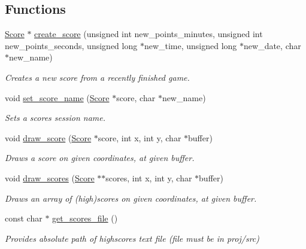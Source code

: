 \subsection*{Functions}
\begin{DoxyCompactItemize}
\item 
\hyperlink{struct_score}{Score} $\ast$ \hyperlink{group__score_gac0781ace02ea3b0c0326eedcbe331017}{create\+\_\+score} (unsigned int new\+\_\+points\+\_\+minutes, unsigned int new\+\_\+points\+\_\+seconds, unsigned long $\ast$new\+\_\+time, unsigned long $\ast$new\+\_\+date, char $\ast$new\+\_\+name)
\begin{DoxyCompactList}\small\item\em Creates a new score from a recently finished game. \end{DoxyCompactList}\item 
void \hyperlink{group__score_gae35db4ff67df11b097733c7d9dd5a40f}{set\+\_\+score\+\_\+name} (\hyperlink{struct_score}{Score} $\ast$score, char $\ast$new\+\_\+name)
\begin{DoxyCompactList}\small\item\em Sets a score\textquotesingle{}s session name. \end{DoxyCompactList}\item 
void \hyperlink{group__score_ga00d69b4d67f70acd50560939535f2464}{draw\+\_\+score} (\hyperlink{struct_score}{Score} $\ast$score, int x, int y, char $\ast$buffer)
\begin{DoxyCompactList}\small\item\em Draws a score on given coordinates, at given buffer. \end{DoxyCompactList}\item 
void \hyperlink{group__score_ga2a08c01d91777c5e1166d04419dbb4c4}{draw\+\_\+scores} (\hyperlink{struct_score}{Score} $\ast$$\ast$scores, int x, int y, char $\ast$buffer)
\begin{DoxyCompactList}\small\item\em Draws an array of (high)scores on given coordinates, at given buffer. \end{DoxyCompactList}\item 
const char $\ast$ \hyperlink{group__score_ga7db0bd0fa660d164c6f16dcc3e45d709}{get\+\_\+scores\+\_\+file} ()
\begin{DoxyCompactList}\small\item\em Provides absolute path of highscores text file (file must be in proj/src) \end{DoxyCompactList}\item 
$$
\end{DoxyCompactItemize}
